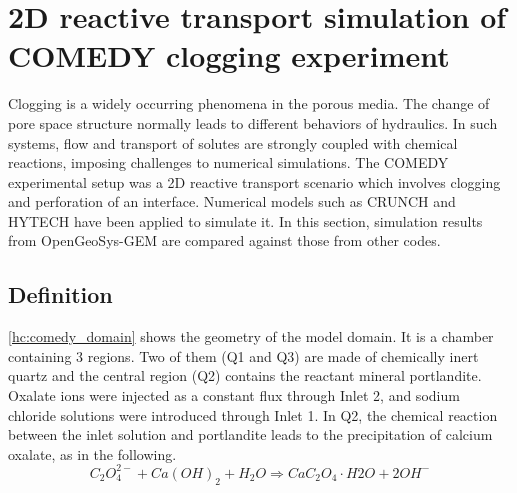\section [Clogging simulation (2D)]{2D reactive transport simulation of COMEDY clogging experiment}
\label{benchmark_2d_comedy}

Clogging is a widely occurring phenomena in the porous media. The change of pore space structure normally leads to different behaviors of hydraulics. In such systems, flow and transport of solutes are strongly coupled with chemical reactions, imposing challenges to numerical simulations. The COMEDY experimental setup \cite{Cochepin2008} was a 2D reactive transport scenario which involves clogging and perforation of an interface. Numerical models such as CRUNCH and HYTECH have been applied to simulate it. In this section, simulation results from OpenGeoSys-GEM are compared against those from other codes. 

\subsection{Definition}
\ref{hc:comedy_domain} shows the geometry of the model domain. It is a chamber containing 3 regions. Two of them (Q1 and Q3) are made of chemically inert quartz and the central region (Q2) contains the reactant mineral portlandite. Oxalate ions were injected as a constant flux through Inlet 2, and sodium chloride solutions were introduced through Inlet 1. In Q2, the chemical reaction between the inlet solution and portlandite leads to the precipitation of calcium oxalate, as in the following. 
\begin{equation}
\label{eq:CaOxylate}
C_2O_4^{2-} + Ca(OH)_2 + H_2O \Rightarrow CaC_2O_4 \cdot H2O + 2OH^-
\end{equation} 

